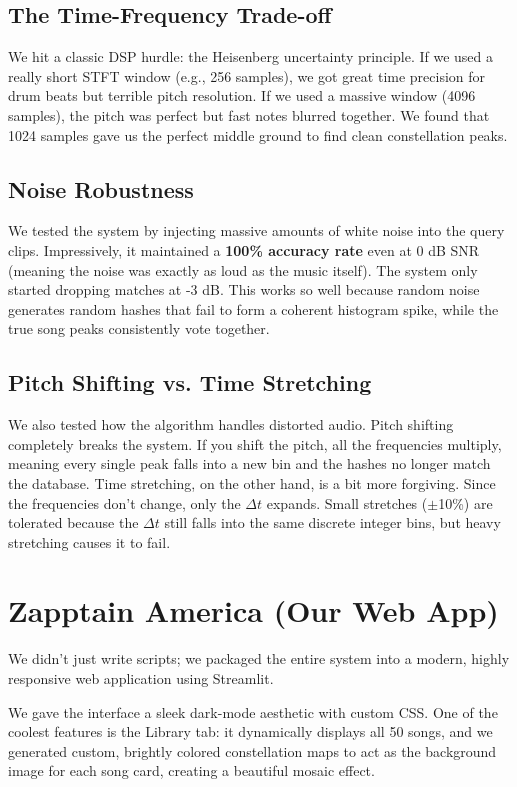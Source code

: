 \documentclass[11pt, a4paper]{article}
\begin{document}
\subsection{The Time-Frequency Trade-off}
We hit a classic DSP hurdle: the Heisenberg uncertainty principle. If we used a really short STFT window (e.g., 256 samples), we got great time precision for drum beats but terrible pitch resolution. If we used a massive window (4096 samples), the pitch was perfect but fast notes blurred together. We found that 1024 samples gave us the perfect middle ground to find clean constellation peaks.

\subsection{Noise Robustness}
We tested the system by injecting massive amounts of white noise into the query clips. Impressively, it maintained a \textbf{100\% accuracy rate} even at 0 dB SNR (meaning the noise was exactly as loud as the music itself). The system only started dropping matches at -3 dB. This works so well because random noise generates random hashes that fail to form a coherent histogram spike, while the true song peaks consistently vote together.

\subsection{Pitch Shifting vs. Time Stretching}
We also tested how the algorithm handles distorted audio. 
Pitch shifting completely breaks the system. If you shift the pitch, all the frequencies multiply, meaning every single peak falls into a new bin and the hashes no longer match the database. 
Time stretching, on the other hand, is a bit more forgiving. Since the frequencies don't change, only the $\Delta t$ expands. Small stretches ($\pm$10\%) are tolerated because the $\Delta t$ still falls into the same discrete integer bins, but heavy stretching causes it to fail.

\section{Zapptain America (Our Web App)}
We didn't just write scripts; we packaged the entire system into a modern, highly responsive web application using Streamlit. 

We gave the interface a sleek dark-mode aesthetic with custom CSS. One of the coolest features is the Library tab: it dynamically displays all 50 songs, and we generated custom, brightly colored constellation maps to act as the background image for each song card, creating a beautiful mosaic effect.
\end{document}
